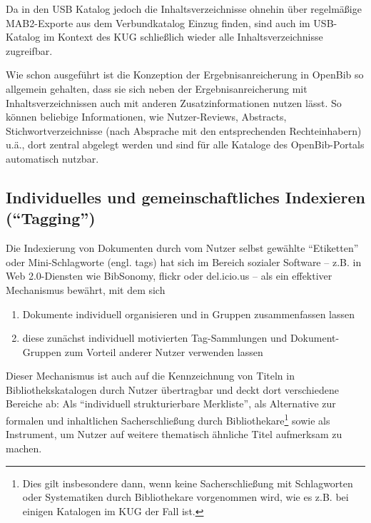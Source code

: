 \documentclass[11pt]{scrartcl}
\begin{document}
Da in den USB Katalog jedoch die Inhaltsverzeichnisse ohnehin über
regelmäßige MAB2-Exporte aus dem Verbundkatalog Einzug finden, sind
auch im USB-Katalog im Kontext des KUG schließlich wieder alle
Inhaltsverzeichnisse zugreifbar.

Wie schon ausgeführt ist die Konzeption der Ergebnisanreicherung in
OpenBib so allgemein gehalten, dass sie sich neben der
Ergebnisanreicherung mit Inhaltsverzeichnissen auch mit anderen
Zusatzinformationen nutzen lässt. So können beliebige Informationen,
wie Nutzer-Reviews, Abstracts, Stichwortverzeichnisse (nach Absprache
mit den entsprechenden Rechteinhabern) u.ä., dort zentral abgelegt
werden und sind für alle Kataloge des OpenBib-Portals automatisch
nutzbar.

\subsection{Individuelles und gemeinschaftliches Indexieren ("`Tagging"')}
Die Indexierung von Dokumenten durch vom Nutzer selbst gewählte
"`Etiketten"' oder Mini-Schlagworte (engl. tags) hat sich im Bereich
sozialer Software -- z.B. in Web 2.0-Diensten wie BibSonomy, flickr
oder del.icio.us -- als ein effektiver Mechanismus bewährt, mit dem
sich
\begin{enumerate}
\item Dokumente individuell organisieren und in Gruppen zusammenfassen
  lassen
\item diese zunächst individuell motivierten Tag-Sammlungen und
  Dokument-Gruppen zum Vorteil anderer Nutzer verwenden lassen
\end{enumerate}

Dieser Mechanismus ist auch auf die Kennzeichnung von Titeln in
Bibliothekskatalogen durch Nutzer übertragbar und deckt dort
verschiedene Bereiche ab: Als "`individuell strukturierbare
Merkliste"', als Alternative zur formalen und inhaltlichen
Sacherschließung durch Bibliothekare\footnote{Dies gilt insbesondere
  dann, wenn keine Sacherschließung mit Schlagworten oder Systematiken
  durch Bibliothekare vorgenommen wird, wie es z.B. bei einigen
  Katalogen im KUG der Fall ist.} sowie als Instrument, um Nutzer auf
weitere thematisch ähnliche Titel aufmerksam zu machen.
\end{document}
